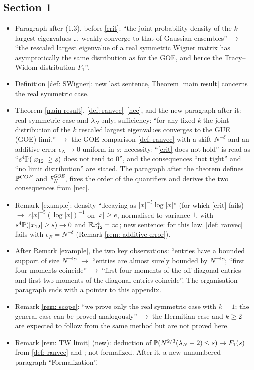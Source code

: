 \subsection*{Section 1}
\begin{itemize}
\item Paragraph after (1.3), before \eqref{crit}: ``the joint probability density of the $k$ largest eigenvalues \dots\ weakly converge to that of Gaussian ensembles'' $\to$ ``the rescaled largest eigenvalue of a real symmetric Wigner matrix has asymptotically the same distribution as for the GOE, and hence the Tracy--Widom distribution $F_1$''.
\item Definition \ref{def: SWigner}: new last sentence, Theorem \ref{main result} concerns the real symmetric case.
\item Theorem \ref{main result}, \eqref{def: ranvec}--\eqref{nec}, and the new paragraph after it: real symmetric case and $\lambda_N$ only; sufficiency: ``for any fixed $k$ the joint distribution of the $k$ rescaled largest eigenvalues converges to the GUE (GOE) limit'' $\to$ the GOE comparison \eqref{def: ranvec} with a shift $N^{-\delta}$ and an additive error $\epsilon_N\to0$ uniform in $s$; necessity: ``\eqref{crit} does not hold'' is read as ``$s^4\mathbb{P}(|x_{12}|\ge s)$ does not tend to $0$'', and the consequences ``not tight'' and ``no limit distribution'' are stated. The paragraph after the theorem defines $\mathbb{P}^{GOE}$ and $F^{GOE}_N$, fixes the order of the quantifiers and derives the two consequences from \eqref{nec}.
\item Remark \ref{example}: density ``decaying as $|x|^{-5}\log|x|$'' (for which \eqref{crit} fails) $\to$ $c|x|^{-5}(\log|x|)^{-1}$ on $|x|\ge e$, normalised to variance $1$, with $s^4\mathbb{P}(|x_{12}|\ge s)\to0$ and $\mathbb{E} x_{12}^4=\infty$; new sentence: for this law, \eqref{def: ranvec} fails with $\epsilon_N=N^{-\delta}$ (Remark \ref{rem: additive error}).
\item After Remark \ref{example}, the two key observations: ``entries have a bounded support of size $N^{-\epsilon}$'' $\to$ ``entries are almost surely bounded by $N^{-\epsilon}$''; ``first four moments coincide'' $\to$ ``first four moments of the off-diagonal entries and first two moments of the diagonal entries coincide''. The organisation paragraph ends with a pointer to this appendix.
\item Remark \ref{rem: scope}: ``we prove only the real symmetric case with $k=1$; the general case can be proved analogously'' $\to$ the Hermitian case and $k\ge2$ are expected to follow from the same method but are not proved here.
\item Remark \ref{rem: TW limit} (new): deduction of $\mathbb{P}(N^{2/3}(\lambda_N-2)\le s)\to F_1(s)$ from \eqref{def: ranvec} and \cite{TR1, TR2}; not formalized. After it, a new unnumbered paragraph ``Formalization''.
\end{itemize}

